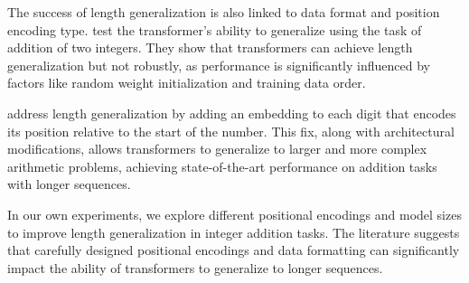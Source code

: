 The success of length generalization is also linked to data format and position encoding type. \cite{zhou_transformers_2024} test the transformer's ability to generalize using the task of addition of two integers. They show that transformers can achieve length generalization but not robustly, as performance is significantly influenced by factors like random weight initialization and training data order.

\cite{mcleish_transformers_2024} address length generalization by adding an embedding to each digit that encodes its position relative to the start of the number. This fix, along with architectural modifications, allows transformers to generalize to larger and more complex arithmetic problems, achieving state-of-the-art performance on addition tasks with longer sequences.

In our own experiments, we explore different positional encodings and model sizes to improve length generalization in integer addition tasks. The literature suggests that carefully designed positional encodings and data formatting can significantly impact the ability of transformers to generalize to longer sequences.